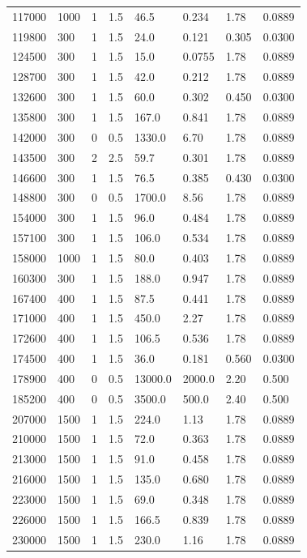 \documentclass[preview]{standalone}
\begin{document}
{{\begin{tabular}{L{1.2cm}C{1.2cm} C{0.3cm}C{0.5cm} C{1.4cm}C{1.4cm} C{1.4cm}C{1.4cm}}
  117000  &  1000  & 1     & 1.5 &  46.5  & 0.234  & 1.78 &  0.0889   \\ 
  119800  &   300  & 1     & 1.5 &  24.0  & 0.121  & 0.305 &  0.0300   \\ 
  124500  &   300  & 1     & 1.5 &  15.0  & 0.0755  & 1.78 &  0.0889   \\ 
  128700  &   300  & 1     & 1.5 &  42.0  & 0.212  & 1.78 &  0.0889   \\ 
  132600  &   300  & 1     & 1.5 &  60.0  & 0.302  & 0.450 &  0.0300   \\ 
  135800  &   300  & 1     & 1.5 &  167.0  & 0.841  & 1.78 &  0.0889   \\ 
  142000  &   300  & 0     & 0.5 &  1330.0  & 6.70  & 1.78 &  0.0889   \\ 
  143500  &   300  & 2     & 2.5 &  59.7  & 0.301  & 1.78 &  0.0889   \\ 
  146600  &   300  & 1     & 1.5 &  76.5  & 0.385  & 0.430 &  0.0300   \\ 
  148800  &   300  & 0     & 0.5 &  1700.0  & 8.56  & 1.78 &  0.0889   \\ 
  154000  &   300  & 1     & 1.5 &  96.0  & 0.484  & 1.78 &  0.0889   \\ 
  157100  &   300  & 1     & 1.5 &  106.0  & 0.534  & 1.78 &  0.0889   \\ 
  158000  &  1000  & 1     & 1.5 &  80.0  & 0.403  & 1.78 &  0.0889   \\ 
  160300  &   300  & 1     & 1.5 &  188.0  & 0.947  & 1.78 &  0.0889   \\ 
  167400  &   400  & 1     & 1.5 &  87.5  & 0.441  & 1.78 &  0.0889   \\ 
  171000  &   400  & 1     & 1.5 &  450.0  & 2.27  & 1.78 &  0.0889   \\ 
  172600  &   400  & 1     & 1.5 &  106.5  & 0.536  & 1.78 &  0.0889   \\ 
  174500  &   400  & 1     & 1.5 &  36.0  & 0.181  & 0.560 &  0.0300   \\ 
  178900  &   400  & 0     & 0.5 &  13000.0  & 2000.0  & 2.20 &  0.500   \\ 
  185200  &   400  & 0     & 0.5 &  3500.0  & 500.0  & 2.40 &  0.500   \\ 
  207000  &  1500  & 1     & 1.5 &  224.0  & 1.13  & 1.78 &  0.0889   \\ 
  210000  &  1500  & 1     & 1.5 &  72.0  & 0.363  & 1.78 &  0.0889   \\ 
  213000  &  1500  & 1     & 1.5 &  91.0  & 0.458  & 1.78 &  0.0889   \\ 
  216000  &  1500  & 1     & 1.5 &  135.0  & 0.680  & 1.78 &  0.0889   \\ 
  223000  &  1500  & 1     & 1.5 &  69.0  & 0.348  & 1.78 &  0.0889   \\ 
  226000  &  1500  & 1     & 1.5 &  166.5  & 0.839  & 1.78 &  0.0889   \\ 
  230000  &  1500  & 1     & 1.5 &  230.0  & 1.16  & 1.78 &  0.0889   \\ 
\hline 
\end{tabular} 

}}
\end{document}
